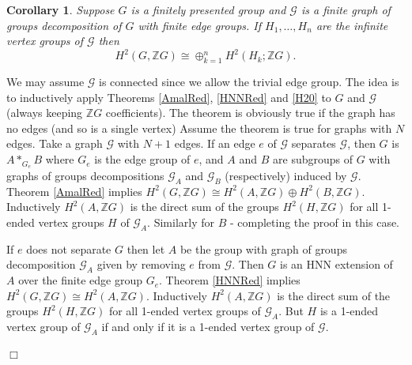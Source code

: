 \documentclass[12pt]{article}
\newtheorem{theorem}{Theorem}[subsection]
\newtheorem{corollary}[theorem]{Corollary}
\newenvironment{proof}{\addvspace{12pt}\noindent{\bf Proof:}}{
$\Box$\par\addvspace{12pt}}
\begin{document}
\begin{corollary} \label{HDun} 
Suppose $G$ is a finitely presented group and $\mathcal G$ is a finite graph of groups decomposition of $G$ with finite edge groups. If $H_1,\ldots, H_n$ are the infinite vertex groups of $\mathcal G$  then 
$$H^2(G,\mathbb ZG)\cong \oplus_{k=1}^n H^2(H_k;\mathbb ZG).$$ 
\end{corollary}
\begin{proof} 
We may assume $\mathcal G$ is connected since we allow the trivial edge group. The idea is to inductively apply Theorems \ref{AmalRed}, \ref{HNNRed} and \ref{H20} to $G$ and $\mathcal G$ (always keeping $\mathbb ZG$ coefficients).
The theorem is obviously true if the graph has no edges (and so is a single vertex) Assume the theorem is true for graphs with $N$ edges. Take a graph $\mathcal G$ with $N+1$ edges. If an edge $e$ of $\mathcal G$ separates $\mathcal G$, then $G$ is $A\ast_{G_e}B$ where $G_e$ is the edge group of $e$, and $A$ and $B$ are subgroups of $G$ with graphs of groups decompositions $\mathcal G_A$ and $\mathcal G_B$ (respectively) induced by $\mathcal G$. Theorem \ref{AmalRed} implies $H^2(G, \mathbb ZG)\cong H^2(A,\mathbb ZG)\oplus H^2(B,\mathbb ZG)$. Inductively $H^2(A,\mathbb ZG)$ is the direct sum of the groups $H^2(H,\mathbb ZG)$ for all 1-ended vertex groups $H$ of $\mathcal G_A$. Similarly for $B$ - completing the proof in this case.

If $e$ does not separate $G$ then let $A$ be the group with graph of groups decomposition $\mathcal G_A$ given by removing $e$ from $\mathcal G$. Then $G$ is an HNN extension of $A$ over the finite edge group $G_e$. Theorem \ref{HNNRed} implies $H^2(G,\mathbb ZG)\cong H^2(A,\mathbb ZG)$. Inductively $H^2(A,\mathbb ZG)$ is the direct sum of the groups $H^2(H,\mathbb ZG)$ for all 1-ended vertex groups of $\mathcal G_A$. But $H$ is a 1-ended vertex group of $\mathcal G_A$ if and only if it is a 1-ended vertex group of $\mathcal G$. 
\end{proof}

\end{document}
